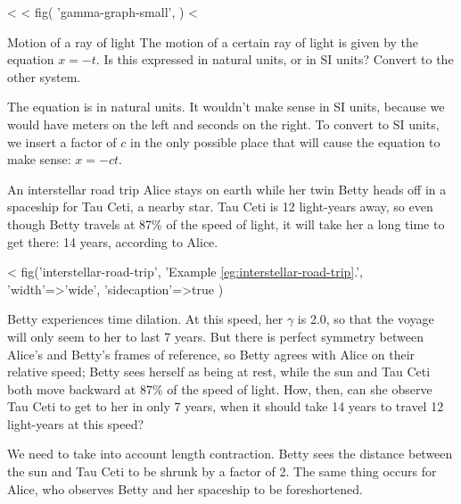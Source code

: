 <%
<%
  fig(
    'gamma-graph-small',
  )
<%


\begin{eg}{Motion of a ray of light}\label{eg:natural-to-si-2}
\egquestion The motion of a certain ray of light is given by the equation $x=-t$. Is this expressed in
natural units, or in SI units? Convert to the other system.

\eganswer The equation is in natural units. It wouldn't make sense in SI units, because we would have
meters on the left and seconds on the right. To convert to SI units, we insert a factor of $c$ in the only
possible place that will cause the equation to make sense: $x=-ct$.
\end{eg}


\begin{eg}{An interstellar road trip}\label{eg:interstellar-road-trip}
Alice stays on earth while her twin Betty
heads off in a spaceship for Tau Ceti, a nearby star. Tau Ceti is 12 light-years
away, so even though Betty travels at 87\% of the speed of light, it will take
her a long time to get there: 14 years, according to Alice.

<%
  fig('interstellar-road-trip',
    'Example \ref{eg:interstellar-road-trip}.',
    {
      'width'=>'wide',
      'sidecaption'=>true
    }
  )

Betty
experiences time dilation. At this speed, her $\gamma$ is 2.0, so that the voyage will
only seem to her to last 7 years. But there is perfect symmetry between Alice's
and Betty's frames of reference, so Betty agrees with Alice on their relative speed;
Betty sees herself as being at rest, while the sun and Tau Ceti both move backward
at 87\% of the speed of light. How, then, can she observe Tau Ceti to get to her
in only 7 years, when it should take 14 years to travel 12 light-years at this speed?

We need to take into account length contraction.
Betty sees the distance between the sun and Tau Ceti
to be shrunk by a factor of 2. The same thing occurs for Alice, who observes
Betty and her spaceship to be foreshortened.
\end{eg}

